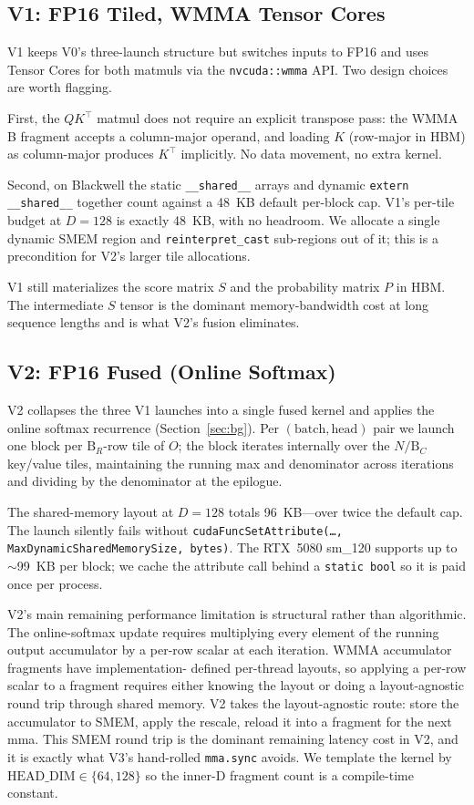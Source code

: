 \documentclass[conference]{IEEEtran}
\begin{document}
\subsection{V1: FP16 Tiled, WMMA Tensor Cores}

V1 keeps V0's three-launch structure but switches inputs to FP16 and
uses Tensor Cores for both matmuls via the \texttt{nvcuda::wmma}
API. Two design choices are worth flagging.

First, the $QK^\top$ matmul does not require an explicit transpose
pass: the WMMA B fragment accepts a column-major operand, and loading
$K$ (row-major in HBM) as column-major produces $K^\top$ implicitly.
No data movement, no extra kernel.

Second, on Blackwell the static \texttt{\_\_shared\_\_} arrays and
dynamic \texttt{extern \_\_shared\_\_} together count against a 48~KB
default per-block cap. V1's per-tile budget at $D = 128$ is exactly
48~KB, with no headroom. We allocate a single dynamic SMEM region
and \texttt{reinterpret\_cast} sub-regions out of it; this is a
precondition for V2's larger tile allocations.

V1 still materializes the score matrix $S$ and the probability
matrix $P$ in HBM. The intermediate $S$ tensor is the dominant
memory-bandwidth cost at long sequence lengths and is what V2's
fusion eliminates.

\subsection{V2: FP16 Fused (Online Softmax)}

V2 collapses the three V1 launches into a single fused kernel and
applies the online softmax recurrence (Section~\ref{sec:bg}). Per
$(\mathrm{batch}, \mathrm{head})$ pair we launch one block per
$\mathrm{B}_R$-row tile of $O$; the block iterates internally over the
$N / \mathrm{B}_C$ key/value tiles, maintaining the running max and
denominator across iterations and dividing by the denominator at the
epilogue.

The shared-memory layout at $D = 128$ totals 96~KB---over twice the
default cap. The launch silently fails without
\texttt{cudaFuncSetAttribute(\dots, MaxDynamicSharedMemorySize,
bytes)}. The RTX~5080 sm\_120 supports up to $\sim$99~KB per block;
we cache the attribute call behind a \texttt{static bool} so it is
paid once per process.

V2's main remaining performance limitation is structural rather than
algorithmic. The online-softmax update requires multiplying every
element of the running output accumulator by a per-row scalar at
each iteration. WMMA accumulator fragments have implementation-
defined per-thread layouts, so applying a per-row scalar to a
fragment requires either knowing the layout or doing a
layout-agnostic round trip through shared memory. V2 takes the
layout-agnostic route: store the accumulator to SMEM, apply the
rescale, reload it into a fragment for the next mma. This SMEM
round trip is the dominant remaining latency cost in V2, and it is
exactly what V3's hand-rolled \texttt{mma.sync} avoids. We template
the kernel by $\mathrm{HEAD\_DIM} \in \{64, 128\}$ so the inner-D
fragment count is a compile-time constant.
\end{document}
